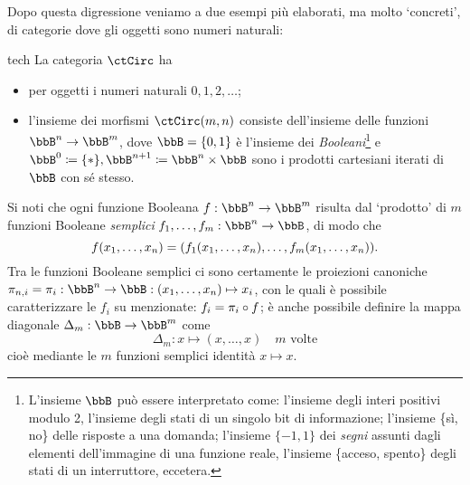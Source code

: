 Dopo questa digressione veniamo a due esempi più elaborati, ma molto `concreti', di categorie dove gli oggetti sono numeri naturali:
\begin{hExample}{tech}\label{ex_cat_circuiti}
	La categoria \(\ctCirc\) ha
	\begin{itemize}
		\item per oggetti i numeri naturali \(0,1,2,\dots\);
		\item l'insieme dei morfismi \(\ctCirc(m,n)\) consiste dell'insieme delle funzioni \(\bbB^n\to \bbB^m\), dove \(\bbB=\{0,1\}\) è l'insieme dei \emph{Booleani}\footnote{L'insieme \(\bbB\) può essere interpretato come: l'insieme degli interi positivi modulo 2, l'insieme degli stati di un singolo bit di informazione; l'insieme \{sì, no\} delle risposte a una domanda; l'insieme \(\{-1,1\}\) dei \emph{segni} assunti dagli elementi dell'immagine di una funzione reale, l'insieme \{acceso, spento\} degli stati di un interruttore, eccetera.} e \(\bbB^0\defeq \{*\}, \bbB^{n+1}\defeq \bbB^n\times \bbB\) sono i prodotti cartesiani iterati di \(\bbB\) con sé stesso.
	\end{itemize}
	Si noti che ogni funzione Booleana \(f : \bbB^n\to\bbB^m\) risulta dal `prodotto' di \(m\) funzioni Booleane \emph{semplici} \(\tup fm, : \bbB^n\to\bbB\), di modo che
	\[f(\tup xn,)=(f_1(\tup xn,),\dots,f_m(\tup xn,)).\]
	Tra le funzioni Booleane semplici ci sono certamente le proiezioni canoniche \(\pi_{n,i} = \pi_i : \bbB^n\to\bbB :(\tup xn,)\mapsto x_i\), con le quali è possibile caratterizzare le \(f_i\) su menzionate: \(f_i = \pi_i\circ f\); è anche possibile definire la mappa diagonale \(\Delta_m:\bbB\to\bbB^m\) come
	\[\Delta_m : x\mapsto (x,\dots,x)\quad m\text{ volte}\]
	cioè mediante le \(m\) funzioni semplici identità \(x\mapsto x\).


\end{hExample}
